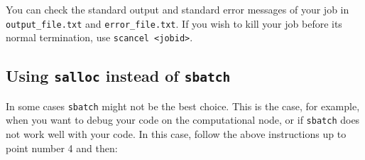 \documentclass{nada-ten}
\begin{document}


You can check the standard output and standard error messages of your job in \verb|output_file.txt| and \verb|error_file.txt|. If you wish to kill your job before its normal termination, use \verb|scancel <jobid>|.

\subsection{Using \texttt{salloc} instead of \texttt{sbatch}}
In some cases \texttt{sbatch} might not be the best choice. This is the case, for example, when you want to debug your code on the computational node, or if \texttt{sbatch} does not work well with your code. In this case, follow the above instructions up to point number 4 and then:
\end{document}
